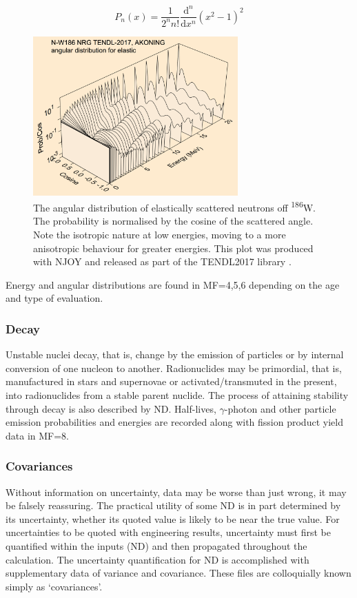 \begin{equation}
  P_{n}(x) = \frac{1}{2^{n}n!} \frac{\mathrm{d}^{n}}{\mathrm{d}x^{n}} (x^{2} - 1)^{2}
  \label{eq:rodrigues}
\end{equation}

\begin{figure}[ht]
  \includegraphics[width=0.7\textwidth]{tungsten_scatter}
  \caption{The angular distribution of elastically scattered neutrons off \textsuperscript{186}W. The probability is normalised by the cosine of the scattered angle. Note the isotropic nature at low energies, moving to a more anisotropic behaviour for greater energies. This plot was produced with NJOY \cite{MacFarlane2010} and released as part of the TENDL2017 library \cite{Rochman2016}.}
  \label{fig:tungsten_scatter}
\end{figure}

Energy and angular distributions are found in MF=4,5,6 depending on the age and type of evaluation.

\subsubsection{Decay}
Unstable nuclei decay, that is, change by the emission of particles or by internal conversion of one nucleon to another. Radionuclides may be primordial, that is, manufactured in stars and supernovae or activated/transmuted in the present, into radionuclides from a stable parent nuclide. The process of attaining stability through decay is also described by ND. Half-lives, $\gamma$-photon and other particle emission probabilities and energies are recorded along with fission product yield data in MF=8. 

\subsubsection{Covariances}
Without information on uncertainty, data may be worse than just wrong, it may be falsely reassuring. The practical utility of some ND is in part determined by its uncertainty, whether its quoted value is likely to be near the true value. For uncertainties to be quoted with engineering results, uncertainty must first be quantified within the inputs (ND) and then propagated throughout the calculation. The uncertainty quantification for ND is accomplished with supplementary data of variance and covariance. These files are colloquially known simply as `covariances'. 

